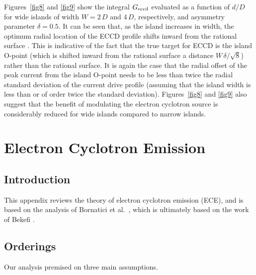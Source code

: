 \documentclass{iopjournal}
\begin{document}
{Figures~\ref{fig8} and \ref{fig9} show the integral $G_{\rm eccd}$ evaluated  as a function of $d/D$ for wide islands of width $W=2\,D$ and $4\,D$, respectively, and asymmetry parameter
$\delta=0.5$. It can be seen that, as the island increases in width, the optimum radial location of the ECCD profile shifts inward from the rational
surface \cite{ece6}. This is indicative of the fact that the true target for ECCD is the island O-point (which is shifted inward from the
rational surface a distance $W\,\delta/\sqrt{8}$) rather than the rational surface. It is again the case that the radial offset of the peak current from the island
O-point needs to be less than twice the radial standard deviation of the current drive profile (assuming that the island width is less than or of order twice the
standard deviation). 
Figures~\ref{fig8} and \ref{fig9}  also suggest that the benefit of modulating the
electron cyclotron source is considerably reduced for wide islands compared to narrow islands. 

\section{Electron Cyclotron Emission}\label{sece}
\subsection{Introduction}
This appendix reviews the theory of electron cyclotron emission (ECE), and is based on the analysis of Bornatici et al.\ \cite{bornatici}, 
which is ultimately based on the work of Bekefi \cite{bekefi}.

\subsection{Orderings}
Our analysis premised on three main assumptions. 

}
\end{document}
